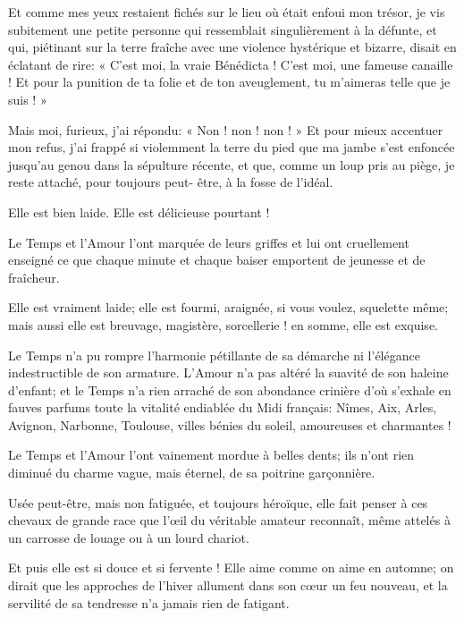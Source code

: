 Et comme mes yeux restaient fichés sur le lieu où était enfoui mon
trésor, je vis subitement une petite personne qui ressemblait
singulièrement à la défunte, et qui, piétinant sur la terre fraîche
avec une violence hystérique et bizarre, disait en éclatant de rire:
« C’est moi, la vraie Bénédicta !
C’est moi, une fameuse canaille ! Et pour la punition
de ta folie et de ton aveuglement, tu m’aimeras telle
que je suis ! »

Mais moi, furieux, j’ai répondu: « Non ! non ! non ! »
Et pour mieux accentuer mon refus, j’ai frappé si
violemment la terre du pied que ma jambe s’est
enfoncée jusqu’au genou dans la sépulture récente, et
que, comme un loup pris au piège, je reste attaché, pour toujours
peut{}- être, à la fosse de l’idéal.


Elle est bien laide. Elle est délicieuse pourtant !

Le Temps et l’Amour l’ont marquée de
leurs griffes et lui ont cruellement enseigné ce que chaque minute et
chaque baiser emportent de jeunesse et de fraîcheur.

Elle est vraiment laide; elle est fourmi, araignée, si vous voulez,
squelette même; mais aussi elle est breuvage, magistère, sorcellerie !
en somme, elle est exquise.

Le Temps n’a pu rompre l’harmonie
pétillante de sa démarche ni l’élégance indestructible
de son armature. L’Amour n’a pas
altéré la suavité de son haleine d’enfant; et le Temps
n’a rien arraché de son abondance crinière
d’où s’exhale en fauves parfums toute
la vitalité endiablée du Midi français: Nîmes, Aix, Arles, Avignon,
Narbonne, Toulouse, villes bénies du soleil, amoureuses et charmantes !

Le Temps et l’Amour l’ont vainement
mordue à belles dents; ils n’ont rien diminué du
charme vague, mais éternel, de sa poitrine garçonnière.

Usée peut{}-être, mais non fatiguée, et toujours héroïque, elle fait
penser à ces chevaux de grande race que l’\oe il du
véritable amateur reconnaît, même attelés à un carrosse de louage ou à
un lourd chariot.

Et puis elle est si douce et si fervente ! Elle aime comme on aime en
automne; on dirait que les approches de l’hiver
allument dans son c\oe ur un feu nouveau, et la servilité de sa tendresse
n’a jamais rien de fatigant.


